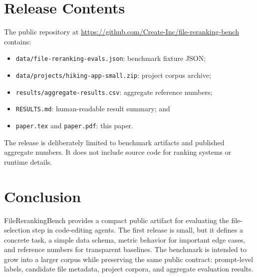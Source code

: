 \documentclass[11pt,a4paper]{article}
\begin{document}
\section{Release Contents}

The public repository at
\url{https://github.com/Create-Inc/file-reranking-bench} contains:

\begin{itemize}[leftmargin=2em]
\item \texttt{data/file-reranking-evals.json}: benchmark fixture JSON;
\item \texttt{data/projects/hiking-app-small.zip}: project corpus archive;
\item \texttt{results/aggregate-results.csv}: aggregate reference numbers;
\item \texttt{RESULTS.md}: human-readable result summary; and
\item \texttt{paper.tex} and \texttt{paper.pdf}: this paper.
\end{itemize}

The release is deliberately limited to benchmark artifacts and published
aggregate numbers. It does not include source code for ranking systems or
runtime details.

\section{Conclusion}

FileRerankingBench provides a compact public artifact for evaluating the
file-selection step in code-editing agents. The first release is small, but it
defines a concrete task, a simple data schema, metric behavior for important
edge cases, and reference numbers for transparent baselines. The benchmark is
intended to grow into a larger corpus while preserving the same public contract:
prompt-level labels, candidate file metadata, project corpora, and aggregate
evaluation results.
\end{document}
